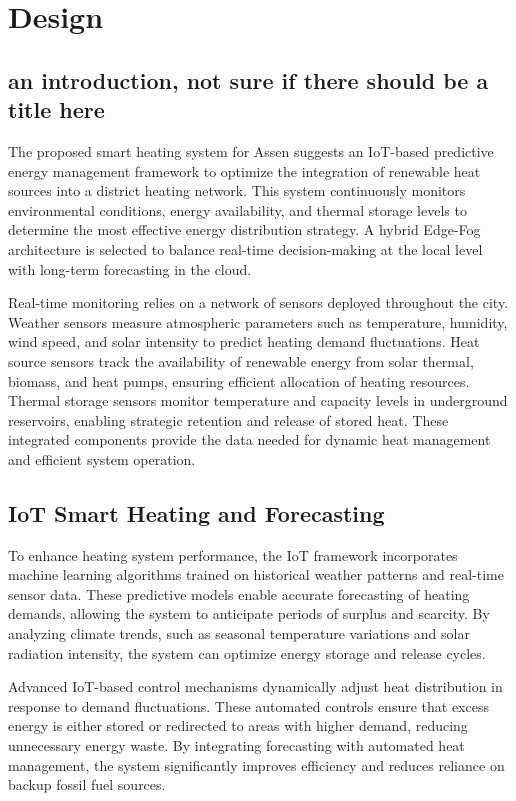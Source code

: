 \documentclass[conference]{IEEEtran}
\begin{document}
\section{Design}
\subsection{an introduction, not sure if there should be a title here}

The proposed smart heating system for Assen suggests an IoT-based predictive energy management framework to optimize the integration of renewable heat sources into a district heating network. This system continuously monitors environmental conditions, energy availability, and thermal storage levels to determine the most effective energy distribution strategy. A hybrid Edge-Fog architecture is selected to balance real-time decision-making at the local level with long-term forecasting in the cloud.

Real-time monitoring relies on a network of sensors deployed throughout the city. Weather sensors measure atmospheric parameters such as temperature, humidity, wind speed, and solar intensity to predict heating demand fluctuations. Heat source sensors track the availability of renewable energy from solar thermal, biomass, and heat pumps, ensuring efficient allocation of heating resources. Thermal storage sensors monitor temperature and capacity levels in underground reservoirs, enabling strategic retention and release of stored heat. These integrated components provide the data needed for dynamic heat management and efficient system operation.

\subsection{IoT Smart Heating and Forecasting}

To enhance heating system performance, the IoT framework incorporates machine learning algorithms trained on historical weather patterns and real-time sensor data. These predictive models enable accurate forecasting of heating demands, allowing the system to anticipate periods of surplus and scarcity. By analyzing climate trends, such as seasonal temperature variations and solar radiation intensity, the system can optimize energy storage and release cycles.

Advanced IoT-based control mechanisms dynamically adjust heat distribution in response to demand fluctuations. These automated controls ensure that excess energy is either stored or redirected to areas with higher demand, reducing unnecessary energy waste. By integrating forecasting with automated heat management, the system significantly improves efficiency and reduces reliance on backup fossil fuel sources.
\end{document}
